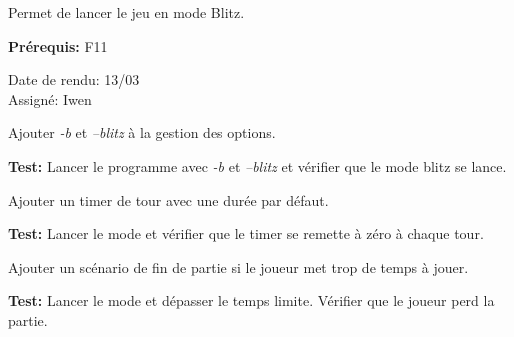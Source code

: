 \documentclass{article}
\begin{document}
\begin{needbox}
    Permet de lancer le jeu en mode Blitz.

    \textbf{Prérequis:} F11
    \begin{duedatebox}
        Date de rendu: 13/03\\
        Assigné: Iwen
    \end{duedatebox}
    \begin{subneedbox}
        Ajouter \textit{-b} et \textit{--blitz} à la gestion des options.

        \textbf{Test:} Lancer le programme avec \textit{-b} et \textit{--blitz} et vérifier que le mode blitz se lance.
    \end{subneedbox}
    \begin{subneedbox}
        Ajouter un timer de tour avec une durée par défaut.

        \textbf{Test:} Lancer le mode et vérifier que le timer se remette à zéro à chaque tour.
    \end{subneedbox}
    \begin{subneedbox}
        Ajouter un scénario de fin de partie si le joueur met trop de temps à jouer.

        \textbf{Test:} Lancer le mode et dépasser le temps limite. Vérifier que le joueur perd la partie.
    \end{subneedbox}
\end{needbox}
\end{document}
